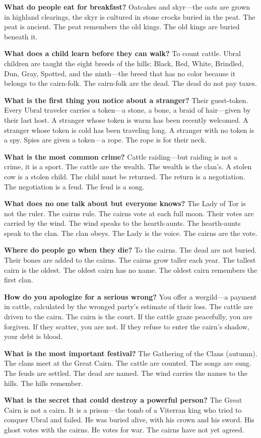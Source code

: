 \begin{almanac}
\textbf{What do people eat for breakfast?} Oatcakes and skyr---the oats are grown in highland clearings, the skyr is cultured in stone crocks buried in the peat. The peat is ancient. The peat remembers the old kings. The old kings are buried beneath it.

\textbf{What does a child learn before they can walk?} To count cattle. Ubral children are taught the eight breeds of the hills: Black, Red, White, Brindled, Dun, Gray, Spotted, and the ninth---the breed that has no color because it belongs to the cairn-folk. The cairn-folk are the dead. The dead do not pay taxes.

\textbf{What is the first thing you notice about a stranger?} Their guest-token. Every Ubral traveler carries a token---a stone, a bone, a braid of hair---given by their last host. A stranger whose token is warm has been recently welcomed. A stranger whose token is cold has been traveling long. A stranger with no token is a spy. Spies are given a token---a rope. The rope is for their neck.

\textbf{What is the most common crime?} Cattle raiding---but raiding is not a crime, it is a sport. The cattle are the wealth. The wealth is the clan's. A stolen cow is a stolen child. The child must be returned. The return is a negotiation. The negotiation is a feud. The feud is a song.

\textbf{What does no one talk about but everyone knows?} The Lady of Tor is not the ruler. The cairns rule. The cairns vote at each full moon. Their votes are carried by the wind. The wind speaks to the hearth-aunts. The hearth-aunts speak to the clan. The clan obeys. The Lady is the voice. The cairns are the vote.

\textbf{Where do people go when they die?} To the cairns. The dead are not buried. Their bones are added to the cairns. The cairns grow taller each year. The tallest cairn is the oldest. The oldest cairn has no name. The oldest cairn remembers the first clan.

\textbf{How do you apologize for a serious wrong?} You offer a wergild---a payment in cattle, calculated by the wronged party's estimate of their loss. The cattle are driven to the cairn. The cairn is the court. If the cattle graze peacefully, you are forgiven. If they scatter, you are not. If they refuse to enter the cairn's shadow, your debt is blood.

\textbf{What is the most important festival?} The Gathering of the Clans (autumn). The clans meet at the Great Cairn. The cattle are counted. The songs are sung. The feuds are settled. The dead are named. The wind carries the names to the hills. The hills remember.

\textbf{What is the secret that could destroy a powerful person?} The Great Cairn is not a cairn. It is a prison---the tomb of a Viterran king who tried to conquer Ubral and failed. He was buried alive, with his crown and his sword. His ghost votes with the cairns. He votes for war. The cairns have not yet agreed.
\end{almanac}

